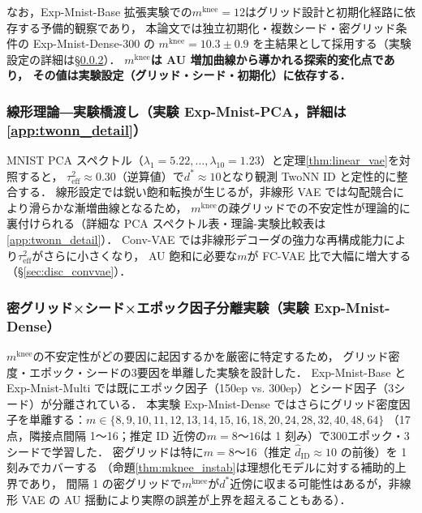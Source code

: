 \documentclass[11pt,a4paper]{jsarticle}
\newcommand{\mknee}{m^{\mathrm{knee}}}
\begin{document}
なお，Exp-Mnist-Base 拡張実験での$\mknee = 12$はグリッド設計と初期化経路に依存する予備的観察であり，
本論文では独立初期化・複数シード・密グリッド条件の Exp-Mnist-Dense-300 の
$\mknee = 10.3 \pm 0.9$ を主結果として採用する（実験設定の詳細は§\ref{sec:exp_el}）．
\textbf{$\mknee$は AU 増加曲線から導かれる探索的変化点であり，
その値は実験設定（グリッド・シード・初期化）に依存する．}

\subsubsection{線形理論―実験橋渡し（実験 Exp-Mnist-PCA，詳細は\ref{app:twonn_detail}）}\label{sec:exp_em}

MNIST PCA スペクトル（$\lambda_1=5.22, \ldots, \lambda_{10}=1.23$）と定理\ref{thm:linear_vae}を対照すると，
$\tau^2_\mathrm{eff} \approx 0.30$（逆算値）で$d^* \approx 10$となり観測 TwoNN ID と定性的に整合する．
線形設定では鋭い飽和転換が生じるが，非線形 VAE では勾配競合により滑らかな漸増曲線となるため，
$\mknee$の疎グリッドでの不安定性が理論的に裏付けられる（詳細な PCA スペクトル表・理論-実験比較表は\ref{app:twonn_detail}）．
Conv-VAE では非線形デコーダの強力な再構成能力により$\tau^2_\mathrm{eff}$がさらに小さくなり，
AU 飽和に必要な$m$が FC-VAE 比で大幅に増大する（§\ref{sec:disc_convvae}）．

\subsubsection{密グリッド×シード×エポック因子分離実験（実験 Exp-Mnist-Dense）}\label{sec:exp_el}

$\mknee$の不安定性がどの要因に起因するかを厳密に特定するため，
グリッド密度・エポック・シードの3要因を単離した実験を設計した．
Exp-Mnist-Base と Exp-Mnist-Multi では既にエポック因子（150ep vs. 300ep）とシード因子（3シード）が分離されている．
本実験 Exp-Mnist-Dense ではさらにグリッド密度因子を単離する：$m \in \{8,9,10,11,12,13,14,15,16,18,20,24,28,32,40,48,64\}$
（17点，隣接点間隔 1〜16；推定 ID 近傍の$m=8$〜$16$は 1 刻み）で300エポック・3シードで学習した．
密グリッドは特に$m = 8$〜16（推定 $\hat{d}_\mathrm{ID} \approx 10$ の前後）を 1 刻みでカバーする
（命題\ref{thm:mknee_instab}は理想化モデルに対する補助的上界であり，
間隔 1 の密グリッドで$\mknee$が$d^*$近傍に収まる可能性はあるが，非線形 VAE の AU 揺動により実際の誤差が上界を超えることもある）．
\end{document}
